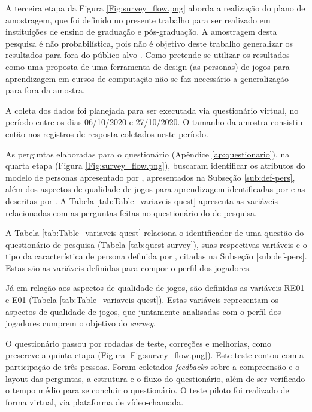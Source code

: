 A terceira etapa da Figura \ref{Fig:survey_flow.png} aborda a realização do plano de amostragem, que foi definido no presente trabalho para ser realizado em instituições de ensino de graduação e pós-graduação. A amostragem desta pesquisa é não probabilística, pois não é objetivo deste trabalho generalizar os resultados para fora do público-alvo \cite{Kasunic_2005}. Como pretende-se utilizar os resultados como uma proposta de uma ferramenta de design (as personas) de jogos para aprendizagem em cursos de computação não se faz necessário a generalização para fora da amostra.

A coleta dos dados foi planejada para ser executada via questionário virtual, no período entre os dias 06/10/2020 e 27/10/2020. O tamanho da amostra consistiu então nos registros de resposta coletados neste período. 

As perguntas elaboradas para o questionário (Apêndice \ref{ap:questionario}), na quarta etapa (Figura \ref{Fig:survey_flow.png}), buscaram identificar os atributos do modelo de personas apresentado por , apresentados na Subseção \ref{sub:def-pers}, além dos aspectos de qualidade de jogos para aprendizagem identificadas por  e as descritas por . A Tabela \ref{tab:Table_variaveis-quest} apresenta as variáveis relacionadas com as perguntas feitas no questionário do de pesquisa.



A Tabela \ref{tab:Table_variaveis-quest} relaciona o identificador de uma questão do questionário de pesquisa (Tabela \ref{tab:quest-survey}), suas respectivas variáveis e o tipo da característica de persona definida por , citadas na Subseção \ref{sub:def-pers}. Estas são as variáveis definidas para compor o perfil dos jogadores. 

Já em relação aos aspectos de qualidade de jogos, são definidas as variáveis RE01 e E01 (Tabela \ref{tab:Table_variaveis-quest}). Estas variáveis representam os aspectos de qualidade de jogos, que juntamente analisadas com o perfil dos jogadores cumprem o objetivo do \textit{survey}.

O questionário passou por rodadas de teste, correções e melhorias, como prescreve a quinta etapa (Figura \ref{Fig:survey_flow.png}). Este teste contou com a participação de três pessoas. Foram coletados \textit{feedbacks} sobre a compreensão e o layout das perguntas, a estrutura e o fluxo do questionário, além de ser verificado o tempo médio para se concluir o questionário. O teste piloto foi realizado de forma virtual, via plataforma de vídeo-chamada.

